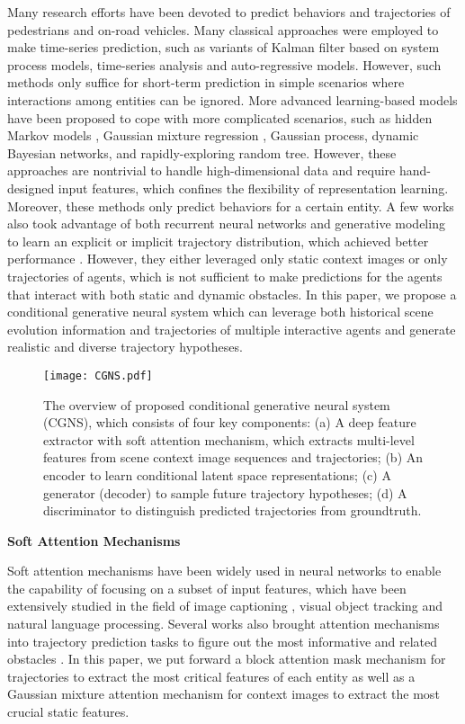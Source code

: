 \documentclass[letterpaper, 10 pt, conference]{ieeeconf}
\begin{document}
Many research efforts have been devoted to predict behaviors and trajectories of pedestrians and on-road vehicles.
Many classical approaches were employed to make time-series prediction, such as variants of Kalman filter based on system process models, time-series analysis and auto-regressive models. 
However, such methods only suffice for short-term prediction in simple scenarios where interactions among entities can be ignored.
More advanced learning-based models have been proposed to cope with more complicated scenarios, such as hidden Markov models \cite{Jiachen_prediction, Wei_benchmark}, Gaussian mixture regression \cite{Jiachen_tracking,Jiachen_ITS}, Gaussian process, dynamic Bayesian networks, and rapidly-exploring random tree. 
However, these approaches are nontrivial to handle high-dimensional data and require hand-designed input features, which confines the flexibility of representation learning. Moreover, these methods only predict behaviors for a certain entity. 
A few works also took advantage of both recurrent neural networks \cite{A9,B1} and generative modeling to learn an explicit or implicit trajectory distribution, which achieved better performance \cite{Jiachen_IV19_1,Jiachen_IV19_2,jiachen_prediction2}. However, they either leveraged only static context images or only trajectories of agents, which is not sufficient to make predictions for the agents that interact with both static and dynamic obstacles.
In this paper, we propose a conditional generative neural system which can leverage both historical scene evolution information and trajectories of multiple interactive agents and generate realistic and diverse trajectory hypotheses.
\vspace{0.1cm}
\begin{figure*}[!tbp]
	\centering
	\texttt{[image: CGNS.pdf]}
	\caption{The overview of proposed conditional generative neural system (CGNS), which consists of four key components: (a) A deep feature extractor with soft attention mechanism, which extracts multi-level features from scene context image sequences and trajectories; (b) An encoder to learn conditional latent space representations; (c) A generator (decoder) to sample future trajectory hypotheses; (d) A discriminator to distinguish predicted trajectories from groundtruth.}
\end{figure*}

\noindent
\textbf{Soft Attention Mechanisms}

Soft attention mechanisms have been widely used in neural networks to enable the capability of focusing on a subset of input features, which have been extensively studied in the field of image captioning \cite{attention-2}, visual object tracking \cite{attention-1} and natural language processing. Several works also brought attention mechanisms into trajectory prediction tasks to figure out the most informative and related obstacles \cite{A1,A3,A14,A6}.
In this paper, we put forward a block attention mask mechanism for trajectories to extract the most critical features of each entity as well as a Gaussian mixture attention mechanism for context images to extract the most crucial static features. 
\vspace{0.1cm}
\end{document}
